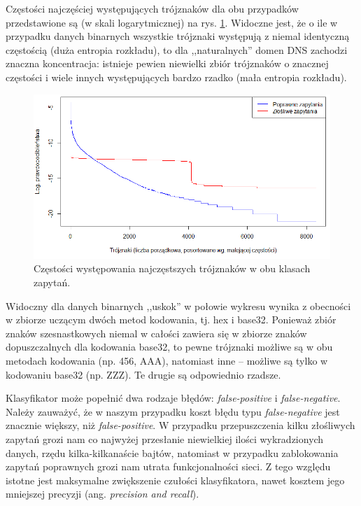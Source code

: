 \documentclass{eiti-raport}
\begin{document}
Częstości najczęściej występujących trójznaków dla obu przypadków przedstawione są (w skali logarytmicznej) na rys. \ref{fig:engrams-hist}. Widoczne jest, że o ile w przypadku danych binarnych wszystkie trójznaki występują z niemal identyczną częstością (duża entropia rozkładu), to dla ,,naturalnych'' domen DNS zachodzi znaczna koncentracja: istnieje pewien niewielki zbiór trójznaków o znacznej częstości i wiele innych występujących bardzo rzadko (mała entropia rozkładu). 
\begin{figure}[!h] \centering
	\includegraphics[width=0.9\linewidth]{img/engrams-hist.PNG}
	\caption{Częstości występowania najczęstszych trójznaków w obu klasach zapytań.} \label{fig:engrams-hist}
\end{figure}
Widoczny dla danych binarnych ,,uskok'' w połowie wykresu wynika z obecności w zbiorze uczącym dwóch metod kodowania, tj. hex i base32. Ponieważ zbiór znaków szesnastkowych niemal w całości zawiera się w zbiorze znaków dopuszczalnych dla kodowania base32, to pewne trójznaki możliwe są w obu metodach kodowania (np. 456, AAA), natomiast inne -- możliwe są tylko w kodowaniu base32 (np. ZZZ). Te drugie są odpowiednio rzadsze. 

Klasyfikator może popełnić dwa rodzaje błędów: \emph{false-positive} i \emph{false-negative}. Należy zauważyć, że w naszym przypadku koszt błędu typu \emph{false-negative} jest znacznie większy, niż \emph{false-positive}. W przypadku przepuszczenia kilku złośliwych zapytań grozi nam co najwyżej przesłanie niewielkiej ilości wykradzionych danych, rzędu kilka-kilkanaście bajtów, natomiast w przypadku zablokowania zapytań poprawnych grozi nam utrata funkcjonalności sieci. Z tego względu istotne jest maksymalne zwiększenie czułości klasyfikatora, nawet kosztem jego mniejszej precyzji (ang. \emph{precision and recall}). 
\end{document}
